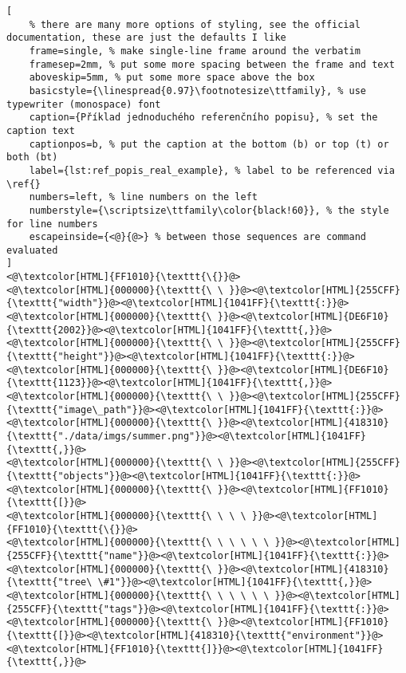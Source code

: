 \begin{lstlisting}[
	% there are many more options of styling, see the official documentation, these are just the defaults I like
	frame=single, % make single-line frame around the verbatim
	framesep=2mm, % put some more spacing between the frame and text
	aboveskip=5mm, % put some more space above the box
	basicstyle={\linespread{0.97}\footnotesize\ttfamily}, % use typewriter (monospace) font
	caption={Příklad jednoduchého referenčního popisu}, % set the caption text
	captionpos=b, % put the caption at the bottom (b) or top (t) or both (bt)
	label={lst:ref_popis_real_example}, % label to be referenced via \ref{}
	numbers=left, % line numbers on the left
	numberstyle={\scriptsize\ttfamily\color{black!60}}, % the style for line numbers
	escapeinside={<@}{@>} % between those sequences are command evaluated
]
<@\textcolor[HTML]{FF1010}{\texttt{\{}}@>
<@\textcolor[HTML]{000000}{\texttt{\ \ }}@><@\textcolor[HTML]{255CFF}{\texttt{"width"}}@><@\textcolor[HTML]{1041FF}{\texttt{:}}@><@\textcolor[HTML]{000000}{\texttt{\ }}@><@\textcolor[HTML]{DE6F10}{\texttt{2002}}@><@\textcolor[HTML]{1041FF}{\texttt{,}}@>
<@\textcolor[HTML]{000000}{\texttt{\ \ }}@><@\textcolor[HTML]{255CFF}{\texttt{"height"}}@><@\textcolor[HTML]{1041FF}{\texttt{:}}@><@\textcolor[HTML]{000000}{\texttt{\ }}@><@\textcolor[HTML]{DE6F10}{\texttt{1123}}@><@\textcolor[HTML]{1041FF}{\texttt{,}}@>
<@\textcolor[HTML]{000000}{\texttt{\ \ }}@><@\textcolor[HTML]{255CFF}{\texttt{"image\_path"}}@><@\textcolor[HTML]{1041FF}{\texttt{:}}@><@\textcolor[HTML]{000000}{\texttt{\ }}@><@\textcolor[HTML]{418310}{\texttt{"./data/imgs/summer.png"}}@><@\textcolor[HTML]{1041FF}{\texttt{,}}@>
<@\textcolor[HTML]{000000}{\texttt{\ \ }}@><@\textcolor[HTML]{255CFF}{\texttt{"objects"}}@><@\textcolor[HTML]{1041FF}{\texttt{:}}@><@\textcolor[HTML]{000000}{\texttt{\ }}@><@\textcolor[HTML]{FF1010}{\texttt{[}}@>
<@\textcolor[HTML]{000000}{\texttt{\ \ \ \ }}@><@\textcolor[HTML]{FF1010}{\texttt{\{}}@>
<@\textcolor[HTML]{000000}{\texttt{\ \ \ \ \ \ }}@><@\textcolor[HTML]{255CFF}{\texttt{"name"}}@><@\textcolor[HTML]{1041FF}{\texttt{:}}@><@\textcolor[HTML]{000000}{\texttt{\ }}@><@\textcolor[HTML]{418310}{\texttt{"tree\ \#1"}}@><@\textcolor[HTML]{1041FF}{\texttt{,}}@>
<@\textcolor[HTML]{000000}{\texttt{\ \ \ \ \ \ }}@><@\textcolor[HTML]{255CFF}{\texttt{"tags"}}@><@\textcolor[HTML]{1041FF}{\texttt{:}}@><@\textcolor[HTML]{000000}{\texttt{\ }}@><@\textcolor[HTML]{FF1010}{\texttt{[}}@><@\textcolor[HTML]{418310}{\texttt{"environment"}}@><@\textcolor[HTML]{FF1010}{\texttt{]}}@><@\textcolor[HTML]{1041FF}{\texttt{,}}@>

\end{lstlisting}
